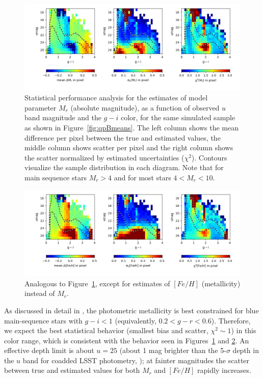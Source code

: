  
\begin{figure}[ht!]
\hskip -0.2in
\includegraphics[width=1.06\textwidth,angle=0]{figures/qpB_estQ_SDSSpatchRA340-350-simLSST_Mr.png}
\vskip -0.3in
\caption{Statistical performance analysis for the estimates of model
  parameter $M_r$ (absolute magnitude), as a function of observed $u$
  band magnitude and the $g-i$ color, for the same simulated sample as shown
  in Figure~\ref{fig:qpBmeans}. 
  The left column shows the mean difference per pixel between the true
  and estimated values, the middle column shows scatter per pixel and
  the right column shows the scatter normalized by estimated
  uncertainties ($\chi^2$). Contours visualize the sample distribution in each
  diagram. Note that for main sequence stars $M_r>4$ and for most
  stars $4 < M_r < 10$. 
\label{fig:perfVSestParamsMr}}
\end{figure}

\begin{figure}[h!]
\hskip -0.2in
\includegraphics[width=1.06\textwidth,angle=0]{figures/qpB_estQ_SDSSpatchRA340-350-simLSST_FeH.png}
\vskip -0.3in
\caption{Analogous to Figure~\ref{fig:perfVSestParamsMr}, except for estimates of $[Fe/H]$ (metallicity) instead of $M_r$. 
\label{fig:perfVSestParamsFeH}}
\end{figure}


As discussed in detail in \cite{2008ApJ...684..287I}, the photometric metallicity is best constrained for blue main-sequence stars with
$g-i<1$ (equivalently, $0.2 < g − r < 0.6$).
Therefore, we expect the best statistical behavior (smallest bias and scatter, $\chi^2 \sim 1$) in this color range, which is consistent with
the behavior seen in Figures~\ref{fig:perfVSestParamsMr} and \ref{fig:perfVSestParamsFeH}. An effective depth limit is about
$u=25$ (about 1 mag brighter than the 5-$\sigma$ depth in the $u$ band for coadded LSST photometry,  \citealt{2022ApJS..258....1B}); 
at fainter magnitudes the scatter between true and estimated values
for both $M_r$ and $[Fe/H]$ rapidly increases.

